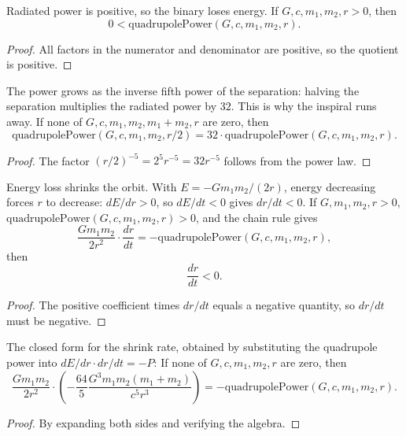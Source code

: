\begin{theorem}
Radiated power is positive, so the binary loses energy. If $G, c, m_1, m_2, r > 0$, then
\[
0 < \text{quadrupolePower}(G, c, m_1, m_2, r).
\]
\begin{proof}
All factors in the numerator and denominator are positive, so the quotient is positive.
\end{proof}
\end{theorem}

\begin{theorem}
The power grows as the inverse fifth power of the separation: halving the separation multiplies the radiated power by $32$. This is why the inspiral runs away. If none of $G, c, m_1, m_2, m_1 + m_2, r$ are zero, then
\[
\text{quadrupolePower}(G, c, m_1, m_2, r/2) = 32 \cdot \text{quadrupolePower}(G, c, m_1, m_2, r).
\]
\begin{proof}
The factor $(r/2)^{-5} = 2^5 r^{-5} = 32 r^{-5}$ follows from the power law.
\end{proof}
\end{theorem}

\begin{theorem}
Energy loss shrinks the orbit. With $E = -Gm_1 m_2 / (2r)$, energy decreasing forces $r$ to decrease: $dE/dr > 0$, so $dE/dt < 0$ gives $dr/dt < 0$. If $G, m_1, m_2, r > 0$, $\text{quadrupolePower}(G, c, m_1, m_2, r) > 0$, and the chain rule gives
\[
\frac{Gm_1 m_2}{2r^2} \cdot \frac{dr}{dt} = -\text{quadrupolePower}(G, c, m_1, m_2, r),
\]
then
\[
\frac{dr}{dt} < 0.
\]
\begin{proof}
The positive coefficient times $dr/dt$ equals a negative quantity, so $dr/dt$ must be negative.
\end{proof}
\end{theorem}

\begin{theorem}
The closed form for the shrink rate, obtained by substituting the quadrupole power into $dE/dr \cdot dr/dt = -P$: If none of $G, c, m_1, m_2, r$ are zero, then
\[
\frac{Gm_1 m_2}{2r^2} \cdot \left(-\frac{64}{5}\frac{G^3 m_1 m_2(m_1 + m_2)}{c^5 r^3}\right) = -\text{quadrupolePower}(G, c, m_1, m_2, r).
\]
\begin{proof}
By expanding both sides and verifying the algebra.
\end{proof}
\end{theorem}

